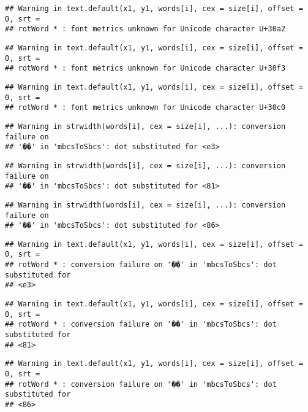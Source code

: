 \documentclass[]{article}
\begin{document}
\begin{verbatim}
## Warning in text.default(x1, y1, words[i], cex = size[i], offset = 0, srt =
## rotWord * : font metrics unknown for Unicode character U+30a2
\end{verbatim}

\begin{verbatim}
## Warning in text.default(x1, y1, words[i], cex = size[i], offset = 0, srt =
## rotWord * : font metrics unknown for Unicode character U+30f3
\end{verbatim}

\begin{verbatim}
## Warning in text.default(x1, y1, words[i], cex = size[i], offset = 0, srt =
## rotWord * : font metrics unknown for Unicode character U+30c0
\end{verbatim}

\begin{verbatim}
## Warning in strwidth(words[i], cex = size[i], ...): conversion failure on
## '��' in 'mbcsToSbcs': dot substituted for <e3>
\end{verbatim}

\begin{verbatim}
## Warning in strwidth(words[i], cex = size[i], ...): conversion failure on
## '��' in 'mbcsToSbcs': dot substituted for <81>
\end{verbatim}

\begin{verbatim}
## Warning in strwidth(words[i], cex = size[i], ...): conversion failure on
## '��' in 'mbcsToSbcs': dot substituted for <86>
\end{verbatim}

\begin{verbatim}
## Warning in text.default(x1, y1, words[i], cex = size[i], offset = 0, srt =
## rotWord * : conversion failure on '��' in 'mbcsToSbcs': dot substituted for
## <e3>
\end{verbatim}

\begin{verbatim}
## Warning in text.default(x1, y1, words[i], cex = size[i], offset = 0, srt =
## rotWord * : conversion failure on '��' in 'mbcsToSbcs': dot substituted for
## <81>
\end{verbatim}

\begin{verbatim}
## Warning in text.default(x1, y1, words[i], cex = size[i], offset = 0, srt =
## rotWord * : conversion failure on '��' in 'mbcsToSbcs': dot substituted for
## <86>
\end{verbatim}
\end{document}

